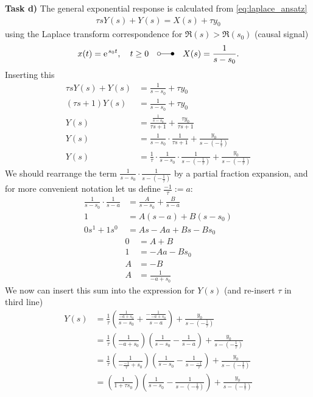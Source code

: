 \documentclass[11pt,a4paper,DIV=12]{scrartcl}
\begin{document}
\textbf{Task d)}
The general exponential response is calculated from \eqref{eq:laplace_ansatz}
\begin{align}
\tau s Y(s) + Y(s) = X(s) + \tau y_0
\end{align}
using the Laplace transform correspondence for $\Re(s)>\Re(s_0)$ (causal signal)
$$x(t) = \e^{s_0 t}, \quad t \geq 0 \quad\laplace\quad X(s) = \frac{1}{s-s_0}.$$
Inserting this
\begin{align}
\tau s Y(s) + Y(s) &= \frac{1}{s-s_0} + \tau y_0\\
(\tau s + 1 ) Y(s) &= \frac{1}{s-s_0} + \tau y_0\\
Y(s) &= \frac{\frac{1}{s-s_0}}{\tau s + 1 } + \frac{\tau y_0}{\tau s + 1}\\
Y(s) &= \frac{1}{s-s_0} \cdot \frac{1}{\tau s + 1} + \frac{y_0}{s - (-\frac{1}{\tau})}\\
Y(s) &= \frac{1}{\tau}\cdot\frac{1}{s-s_0} \cdot \frac{1}{s -(-\frac{1}{\tau})} + \frac{y_0}{s - (-\frac{1}{\tau})}
\end{align}
We should rearrange the term $\frac{1}{s-s_0} \cdot \frac{1}{s -(-\frac{1}{\tau})}$ by a partial fraction expansion, and for more convenient notation let us define $\frac{-1}{\tau} := a$:
%
\begin{align}
\frac{1}{s-s_0} \cdot \frac{1}{s - a} &= \frac{A}{s-s_0} + \frac{B}{s - a}\\
1 &= A (s-a) + B (s-s_0)\\
0 s^1 + 1 s^0 &= A s - A a + B s - B s_0
\end{align}
\begin{align}
0 &= A + B\\
1 &= -A a - B s_0\\
A &= -B\\
A &= \frac{1}{-a + s_0}
\end{align}
%
We now can insert this sum into the expression for $Y(s)$ (and re-insert $\tau$ in third line)
\begin{align}
Y(s) &= \frac{1}{\tau}
\left(
\frac{\frac{1}{-a + s_0}}{s-s_0} + \frac{-\frac{1}{-a + s_0}}{s - a}
\right) + \frac{y_0}{s - (-\frac{1}{\tau})}\\
&=
\frac{1}{\tau} (\frac{1}{-a + s_0}) (\frac{1}{s-s_0} - \frac{1}{s - a}) + \frac{y_0}{s - (-\frac{1}{\tau})}\\
&=\frac{1}{\tau} (\frac{1}{-\frac{-1}{\tau} + s_0}) (\frac{1}{s-s_0} - \frac{1}{s - \frac{-1}{\tau}}) + \frac{y_0}{s - (-\frac{1}{\tau})}\\
&= (\frac{1}{1 + \tau s_0}) (\frac{1}{s-s_0} - \frac{1}{s - (-\frac{1}{\tau})}) + \frac{y_0}{s - (-\frac{1}{\tau})}
\end{align}
\end{document}
